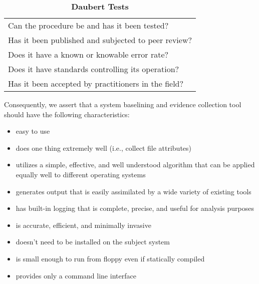 \documentclass[10pt]{article}
\begin{document}
\begin{table}[h]
\begin{center}
\caption{\bf Daubert Tests\label{tbl:daubert}}\vspace{.2em}
\begin{tabular}{l}\hline
  Can the procedure be and has it been tested? \\
  Has it been published and subjected to peer review? \\
  Does it have a known or knowable error rate? \\
  Does it have standards controlling its operation? \\
  Has it been accepted by practitioners in the field? \\
\end{tabular}
\end{center}
\end{table}

Consequently, we assert that a system baselining and evidence
collection tool should have the following characteristics:

\begin{itemize}

  \item
  easy to use

  \item
  does one thing extremely well (i.e., collect file attributes)

  \item
  utilizes a simple, effective, and well understood algorithm that can
  be applied equally well to different operating systems

  \item
  generates output that is easily assimilated by a wide variety of
  existing tools

  \item
  has built-in logging that is complete, precise, and useful for
  analysis purposes

  \item
  is accurate, efficient, and minimally invasive

  \item
  doesn't need to be installed on the subject system

  \item
  is small enough to run from floppy even if statically compiled

  \item
  provides only a command line interface

\end{itemize}
\end{document}
